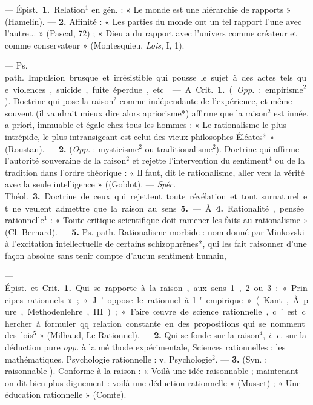 \begin{itemize}[leftmargin=1cm, label=, itemsep=1pt]
 — \si{Épist.} {\bf 1.} Relation$^1$ en
gén. : « Le monde est une hiérarchie
de rapports » (Hamelin). — {\bf 2.} Affinité : « Les parties du monde ont un
tel rapport l’une avec l’autre... »
(Pascal, 72) ; « Dieu a du rapport
avec l’univers comme créateur et
comme conservateur » (Montesquieu, {\it Lois}, I, 1).

 — \si{Ps. path.} Impulsion brusque
et irrésistible qui pousse le sujet à
des actes tels que violences, suicide,
fuite éperdue, etc.

 — A. \si{Crit.} {\bf 1.} ({\it Opp.} :
empirisme$^2$). Doctrine qui pose la
raison$^2$ comme indépendante de
l'expérience, et même souvent (il
vaudrait mieux dire alors apriorisme*) affirme que la raison$^2$ est
innée, a priori, immuable et égale
chez tous les hommes : « Le rationalisme le plus intrépide, le plus
intransigeant est celui des vieux
philosophes Éléates* » (Roustan). —
 {\bf 2.} ({\it Opp.} : mysticisme$^2$ ou traditionalisme$^2$). Doctrine qui affirme l’autorité souveraine de la raison$^2$ et rejette l'intervention du sentiment$^4$
ou de la tradition dans l’ordre théorique : « Il faut, dit le rationalisme,
aller vers la vérité avec la seule
intelligence » ((Goblot). — {\it Spéc.} \si{Théol.}
 {\bf 3.} Doctrine de ceux qui rejettent
toute révélation et tout surnaturel
et ne veulent admettre que la raison
au sens {\bf 5.}

— À. {\bf 4.} Rationalité, pensée rationnelle$^1$ : « Toute critique scientifique doit ramener les faits au rationalisme » (Cl. Bernard). — {\bf 5.} Ps.
path. Rationalisme morbide : nom
donné par Minkovski à l'excitation
intellectuelle de certains schizophrènes*, qui les fait raisonner d’une
façon absolue sans tenir compte
d'aucun sentiment humain,

 — \si{Épist.} et \si{Crit.} {\bf 1.} Qui se
rapporte à la raison, aux sens 1, 2
ou 3 : « Principes rationnels » ;

« J’oppose le rationnel à l'empirique » (Kant, À. pure, Methodenlehre, III) ; « Faire œuvre de science
rationnelle, c’est chercher à formuler qq. relation constante en des
propositions qui se nomment des
lois$^5$ » (Milhaud, Le Rationnel). —
 {\bf 2.} Qui se fonde sur la raison$^4$, {\it i. e.}
sur la déduction pure {\it opp.} à la mé
thode expérimentale, Sciences rationnelles : les mathématiques. Psychologie rationnelle : v. Psychologie$^2$.
— {\bf 3.} (Syn. : raisonnable ). Conforme
à la raison : « Voilà une idée raisonnable ; maintenant on dit bien plus
dignement : voilà une déduction
rationnelle » (Musset) ; « Une éducation rationnelle » (Comte).


\end{itemize}
